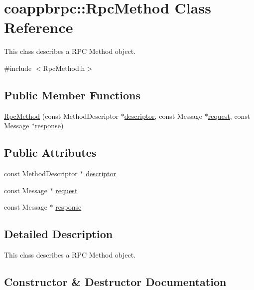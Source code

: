 \hypertarget{classcoappbrpc_1_1RpcMethod}{}\section{coappbrpc\+:\+:Rpc\+Method Class Reference}
\label{classcoappbrpc_1_1RpcMethod}


This class describes a R\+PC Method object.  




{\ttfamily \#include $<$Rpc\+Method.\+h$>$}

\subsection*{Public Member Functions}
\begin{DoxyCompactItemize}
\item 
\hyperlink{classcoappbrpc_1_1RpcMethod_af48f7fb693239a6b0359dc083b855a93}{Rpc\+Method} (const Method\+Descriptor $\ast$\hyperlink{classcoappbrpc_1_1RpcMethod_a52010a290e164174ca969c8904d1f3da}{descriptor}, const Message $\ast$\hyperlink{classcoappbrpc_1_1RpcMethod_ac8d0272f2480f41d10c91c023708b8f8}{request}, const Message $\ast$\hyperlink{classcoappbrpc_1_1RpcMethod_a95a64db4546c8e418232fafa297fc9a5}{response})
\end{DoxyCompactItemize}
\subsection*{Public Attributes}
\begin{DoxyCompactItemize}
\item 
const Method\+Descriptor $\ast$ \hyperlink{classcoappbrpc_1_1RpcMethod_a52010a290e164174ca969c8904d1f3da}{descriptor}
\item 
const Message $\ast$ \hyperlink{classcoappbrpc_1_1RpcMethod_ac8d0272f2480f41d10c91c023708b8f8}{request}
\item 
const Message $\ast$ \hyperlink{classcoappbrpc_1_1RpcMethod_a95a64db4546c8e418232fafa297fc9a5}{response}
\end{DoxyCompactItemize}


\subsection{Detailed Description}
This class describes a R\+PC Method object. 

\subsection{Constructor \& Destructor Documentation}
\mbox{\label{classcoappbrpc_1_1RpcMethod_af48f7fb693239a6b0359dc083b855a93}} 
